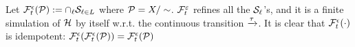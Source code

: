 Let $\mathcal{F}_t^\epsilon(\mathcal{P}) := \cap_{\ell}\mathcal{S}_{\ell \in L}$ where $\mathcal{P} = X/\sim$. $\mathcal{F}_t^\varepsilon$ refines all the $\mathcal{S}_\ell$'s, and it is a finite simulation of $\mathcal{H}$ by itself w.r.t. the continuous transition $\xrightarrow{\tau}$.
It is clear that $\mathcal{F}_t^\epsilon(\cdot)$ is idempotent: $\mathcal{F}_t^\epsilon(\mathcal{F}_t^\epsilon(\mathcal{P})) = \mathcal{F}_t^\epsilon(\mathcal{P})$
%
%

